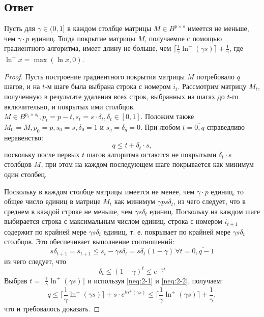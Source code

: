 \documentclass[11pt]{article}
\newcounter{th}\setcounter{th}{0}
\def\th{\par\smallskip\refstepcounter{th}\textbf{\arabic{th}}}
\newtheorem*{Theorem}{Теорема \th}
\begin{document}
\subsection{Ответ}
\label{sec:org8dee76a}
   \begin{Theorem}
Пусть для $\gamma \in (0, 1]$ в каждом столбце матрицы $M \in B^{p \times s}$ имеется не меньше, чем $\gamma\cdot p$ единиц. Тогда покрытие матрицы $M$, получаемое с помощью градиентного алгоритма, имеет длину не больше, чем $\lceil\frac1{\gamma}\ln^+(\gamma s)\rceil + \frac1{\gamma}$, где $\ln^+ x = \max(\ln x, 0)$.
   \end{Theorem}
   \begin{proof}
Пусть построение градиентного покрытия матрицы $M$ потребовало $q$ шагов, и на $t$-м шаге была выбрана строка с номером $i_t$. Рассмотрим матрицу $M_t$, полученную в результате удаления всех строк, выбранных на шагах до $t$-го включительно, и покрытых ими столбцов. $M \in B^{p_t\times s_t}, p_t = p - t, s_t = s\cdot \delta_t, \delta_t \in [0, 1]$. Положим также $M_0 = M, p_0 = p, s_0 = s, \delta_0 = 1$  и $s_q = \delta_q = 0$. При любом $t = \overline{0, q}$ справедливо неравенство:
\begin{equation}\label{neq:2-1}
q \leq t + \delta_t\cdot s,
\end{equation}
поскольку после первых $t$ шагов алгоритма остаются не покрытыми $\delta_t\cdot s$ столбцов $M$, при этом на каждом последующем шаге покрывается как минимум один столбец.

Поскольку в каждом столбце матрицы имеется не менее, чем $\gamma\cdot p$ единиц, то общее число единиц в матрице $M_t$ как минимум $\gamma ps\delta_t$, из чего следует, что в среднем в каждой строке не меньше, чем $\gamma s\delta_t$ единиц. Поскольку на каждом шаге выбирается строка с максимальным числом единиц, строка с номером $i_{t + 1}$ содержит по крайней мере $\gamma s\delta_t$ единиц, т. е. покрывает по крайней мере $\gamma s\delta_t$ столбцов. Это обеспечивает выполнение соотношений:
\begin{equation*}
s\delta_{t + 1} = s_{t + 1} \leq s_t - \gamma s\delta_t = s\delta_t(1 - \gamma)\, \forall t = \overline{0, q - 1}
\end{equation*}
из чего следует, что
\begin{equation}\label{neq:2-2}
\delta_t \leq (1 - \gamma)^t \leq e^{-\gamma t}
\end{equation}
Выбрав $t = \lceil\frac1{\gamma}\ln^+(\gamma s)\rceil$ и используя \eqref{neq:2-1} и \eqref{neq:2-2}, получаем:
\begin{equation}
q \leq \lceil\frac1{\gamma}\ln^+(\gamma s)\rceil + s\cdot e^{ln^+(\gamma s)} \leq \lceil\frac1{\gamma}\ln^+(\gamma s)\rceil + \frac1{\gamma},
\end{equation}
что и требовалось доказать.
   \end{proof}
\pagebreak
\end{document}
